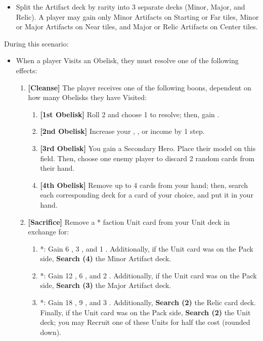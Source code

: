 \begin{multicols*}{2}
\begin{itemize}
    \item Split the Artifact deck by rarity into 3 separate decks (Minor, Major, and Relic). A player may gain only Minor Artifacts on Starting or Far tiles, Minor or Major Artifacts on Near tiles, and Major or Relic Artifacts on Center tiles.
\end{itemize}

During this scenario:

\begin{itemize}
    \item When a player Visits an Obelisk, they must resolve one of the following effects:
    \begin{enumerate}[leftmargin=15pt]
        \item \textbf{[Cleanse]} The player receives one of the following boons, dependent on how many Obelisks they have Visited:
        \begin{enumerate}
            \item \textbf{[1st Obelisk]} Roll 2  and choose 1 to resolve; then, gain .
            \item \textbf{[2nd Obelisk]} Increase your , , or  income by 1 step.
            \item \textbf{[3rd Obelisk]} You gain a Secondary Hero. Place their model on this field. Then, choose one enemy player to discard 2 random cards from their hand.
            \item \textbf{[4th Obelisk]} Remove up to 4 cards from your hand; then, search each corresponding deck for a card of your choice, and put it in your hand.
        \end{enumerate}
        \item \textbf{[Sacrifice]} Remove a * faction Unit card from your Unit deck in exchange for:
        \begin{enumerate}
            \item *: Gain 6 , 3 , and 1 . Additionally, if the Unit card was on the Pack side, \textbf{Search (4)} the Minor Artifact deck.
            \item *: Gain 12 , 6 , and 2 . Additionally, if the Unit card was on the Pack side, \textbf{Search (3)} the Major Artifact deck.
            \item *: Gain 18 , 9 , and 3 . Additionally, \textbf{Search (2)} the Relic card deck. Finally, if the Unit card was on the Pack side, \textbf{Search (2)} the  Unit deck; you may Recruit one of these Units for half the cost (rounded down).

\end{enumerate}
\end{enumerate}
\end{itemize}
\end{multicols*}
